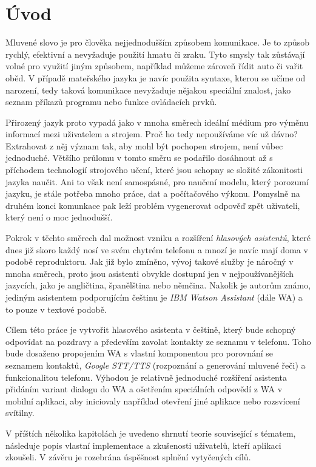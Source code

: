 \chapter*{Úvod}

Mluvené slovo je pro člověka nejjednodušším způsobem komunikace. Je to
způsob rychlý, efektivní a nevyžaduje použití hmatu či zraku. Tyto smysly
tak zůstávají volné pro využití jiným způsobem, například můžeme zároveň
řídit auto či vařit oběd. V případě mateřského jazyka je navíc použita
syntaxe, kterou se učíme od narození, tedy taková komunikace nevyžaduje
nějakou speciální znalost, jako seznam příkazů programu nebo funkce
ovládacích prvků.

Přirozený jazyk proto vypadá jako v mnoha směrech ideální médium pro výměnu
informací mezi uživatelem a strojem. Proč ho tedy nepoužíváme víc už dávno?
Extrahovat z něj význam tak, aby mohl být pochopen strojem, není vůbec
jednoduché. Většího průlomu v tomto směru se podařilo dosáhnout až s příchodem
technologií strojového učení, které jsou schopny se složité zákonitosti
jazyka  naučit. Ani to však není samospásné, pro naučení modelu,
který porozumí jazyku, je stále potřeba mnoho práce, dat a počítačového
výkonu. Pomyslně na druhém konci komunkace pak leží problém vygenerovat
odpověď zpět uživateli, který není o moc jednodušší.

Pokrok v těchto směrech dal možnost vzniku a rozšíření
\textit{hlasových asistentů}, které dnes již skoro každý nosí ve svém
chytrém telefonu a mnozí je navíc mají doma v podobě 
reproduktoru. Jak již bylo zmíněno, vývoj takové služby je náročný v mnoha
směrech, proto jsou asistenti obvykle dostupní jen v nejpoužívanějších
jazycích, jako je angličtina, španělština nebo němčina. Nakolik je autorům
známo, jediným asistentem podporujícím češtinu je \textit{IBM Watson Assistant}
(dále WA) a to pouze v textové podobě.

Cílem této práce je vytvořit hlasového asistenta v češtině, který bude schopný
odpovídat na pozdravy a především zavolat kontakty ze seznamu v telefonu.
Toho bude dosaženo propojením WA s vlastní komponentou
pro porovnání se seznamem kontaktů, \textit{Google STT/TTS}
(rozpoznání a generování mluvené řeči) a funkcionalitou telefonu. Výhodou
je relativně jednoduché rozšíření asistenta přidáním variant dialogu do WA
a ošetřením speciálních odpovědí z WA v mobilní aplikaci, aby iniciovaly
například otevření jiné aplikace nebo rozsvícení svítilny.

V příštích několika kapitolách je uvedeno shrnutí teorie související
s tématem, následuje popis vlastní implementace a zkušenosti uživatelů,
kteří aplikaci zkoušeli. V závěru je rozebrána úspěšnost splnění
vytyčených cílů.
